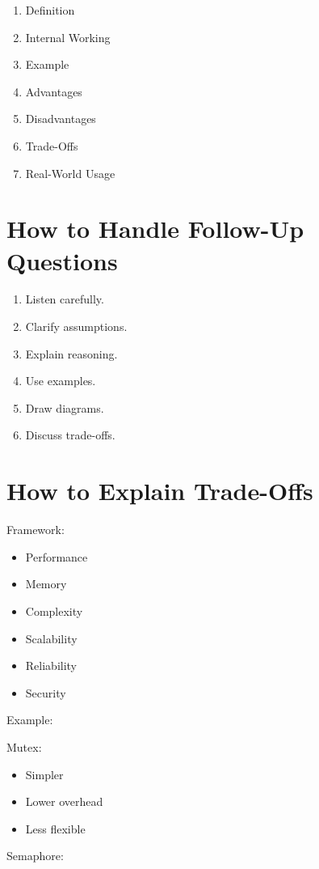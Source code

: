 \begin{enumerate}
\item Definition
\item Internal Working
\item Example
\item Advantages
\item Disadvantages
\item Trade-Offs
\item Real-World Usage
\end{enumerate}

\section{How to Handle Follow-Up Questions}

\begin{enumerate}
\item Listen carefully.
\item Clarify assumptions.
\item Explain reasoning.
\item Use examples.
\item Draw diagrams.
\item Discuss trade-offs.
\end{enumerate}

\section{How to Explain Trade-Offs}

Framework:

\begin{itemize}
\item Performance
\item Memory
\item Complexity
\item Scalability
\item Reliability
\item Security
\end{itemize}

Example:

Mutex:

\begin{itemize}
\item Simpler
\item Lower overhead
\item Less flexible
\end{itemize}

Semaphore:

